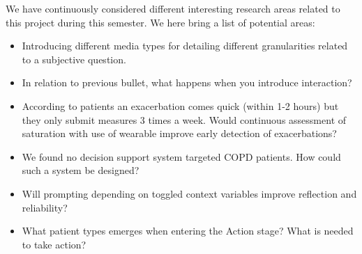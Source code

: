 We have continuously considered different interesting research areas related to this project during this semester. We here bring a list of potential areas:

\begin{itemize}
	\item Introducing different media types for detailing different granularities related to a subjective question.
	\item In relation to previous bullet, what happens when you introduce interaction? 
	\item According to patients an exacerbation comes quick (within 1-2 hours) but they only submit measures 3 times a week. Would continuous assessment of saturation with use of wearable improve early detection of exacerbations?
	\item We found no decision support system targeted COPD patients. How could such a system be designed?
	\item Will prompting depending on toggled context variables improve reflection and reliability?
	\item What patient types emerges when entering the Action stage? What is needed to take action?
\end{itemize}